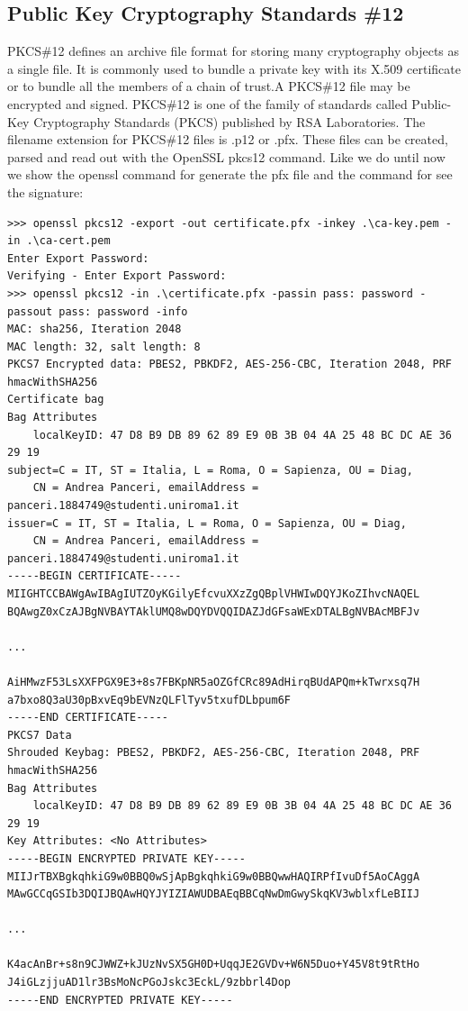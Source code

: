 \documentclass{article}
\begin{document}
\subsection{Public Key Cryptography Standards \#12}
PKCS\#12 defines an archive file format for storing many cryptography objects as a single file. It is commonly used to bundle a private key with its X.509 certificate or to bundle all the members of a chain of trust.A PKCS\#12 file may be encrypted and signed. PKCS\#12 is one of the family of standards called Public-Key Cryptography Standards (PKCS) published by RSA Laboratories. The filename extension for PKCS\#12 files is .p12 or .pfx. These files can be created, parsed and read out with the OpenSSL pkcs12 command. Like we do until now we show the openssl command for generate the pfx file and the command for see the signature:\\
\begin{lstlisting}[basicstyle=\tiny]
>>> openssl pkcs12 -export -out certificate.pfx -inkey .\ca-key.pem -in .\ca-cert.pem
Enter Export Password:
Verifying - Enter Export Password:
>>> openssl pkcs12 -in .\certificate.pfx -passin pass: password -passout pass: password -info
MAC: sha256, Iteration 2048
MAC length: 32, salt length: 8
PKCS7 Encrypted data: PBES2, PBKDF2, AES-256-CBC, Iteration 2048, PRF hmacWithSHA256
Certificate bag
Bag Attributes
    localKeyID: 47 D8 B9 DB 89 62 89 E9 0B 3B 04 4A 25 48 BC DC AE 36 29 19
subject=C = IT, ST = Italia, L = Roma, O = Sapienza, OU = Diag, 
    CN = Andrea Panceri, emailAddress = panceri.1884749@studenti.uniroma1.it
issuer=C = IT, ST = Italia, L = Roma, O = Sapienza, OU = Diag, 
    CN = Andrea Panceri, emailAddress = panceri.1884749@studenti.uniroma1.it
-----BEGIN CERTIFICATE-----
MIIGHTCCBAWgAwIBAgIUTZOyKGilyEfcvuXXzZgQBplVHWIwDQYJKoZIhvcNAQEL
BQAwgZ0xCzAJBgNVBAYTAklUMQ8wDQYDVQQIDAZJdGFsaWExDTALBgNVBAcMBFJv

...

AiHMwzF53LsXXFPGX9E3+8s7FBKpNR5aOZGfCRc89AdHirqBUdAPQm+kTwrxsq7H
a7bxo8Q3aU30pBxvEq9bEVNzQLFlTyv5txufDLbpum6F
-----END CERTIFICATE-----
PKCS7 Data
Shrouded Keybag: PBES2, PBKDF2, AES-256-CBC, Iteration 2048, PRF hmacWithSHA256
Bag Attributes
    localKeyID: 47 D8 B9 DB 89 62 89 E9 0B 3B 04 4A 25 48 BC DC AE 36 29 19
Key Attributes: <No Attributes>
-----BEGIN ENCRYPTED PRIVATE KEY-----
MIIJrTBXBgkqhkiG9w0BBQ0wSjApBgkqhkiG9w0BBQwwHAQIRPfIvuDf5AoCAggA
MAwGCCqGSIb3DQIJBQAwHQYJYIZIAWUDBAEqBBCqNwDmGwySkqKV3wblxfLeBIIJ

...

K4acAnBr+s8n9CJWWZ+kJUzNvSX5GH0D+UqqJE2GVDv+W6N5Duo+Y45V8t9tRtHo
J4iGLzjjuAD1lr3BsMoNcPGoJskc3EckL/9zbbrl4Dop
-----END ENCRYPTED PRIVATE KEY-----
\end{lstlisting}
\end{document}
